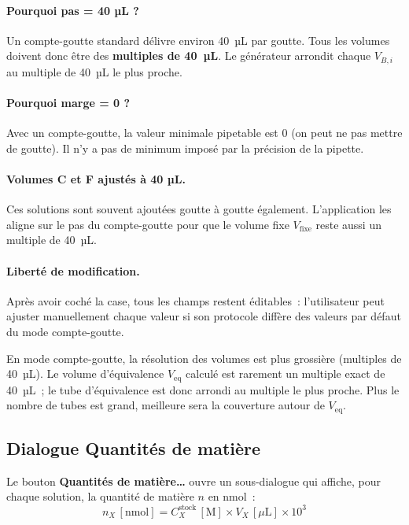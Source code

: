 \documentclass[12pt, a4paper]{article}
\begin{document}
\paragraph{Pourquoi pas = 40 µL ?}
Un compte-goutte standard délivre environ 40~µL par goutte. Tous les volumes
doivent donc être des \textbf{multiples de 40~µL}. Le générateur arrondit
chaque $V_{B,i}$ au multiple de 40~µL le plus proche.

\paragraph{Pourquoi marge = 0 ?}
Avec un compte-goutte, la valeur minimale pipetable est 0 (on peut ne pas
mettre de goutte). Il n'y a pas de minimum imposé par la précision de la
pipette.

\paragraph{Volumes C et F ajustés à 40 µL.}
Ces solutions sont souvent ajoutées goutte à goutte également. L'application
les aligne sur le pas du compte-goutte pour que le volume fixe
$V_\text{fixe}$ reste aussi un multiple de 40~µL.

\paragraph{Liberté de modification.}
Après avoir coché la case, tous les champs restent éditables~: l'utilisateur
peut ajuster manuellement chaque valeur si son protocole diffère des valeurs
par défaut du mode compte-goutte.

\begin{remarque}
En mode compte-goutte, la résolution des volumes est plus grossière
(multiples de 40~µL). Le volume d'équivalence $V_\text{eq}$ calculé est
rarement un multiple exact de 40~µL~; le tube \og d'équivalence\fg{}
est donc arrondi au multiple le plus proche. Plus le nombre de tubes est
grand, meilleure sera la couverture autour de $V_\text{eq}$.
\end{remarque}

\subsection{Dialogue \og Quantités de matière\fg{}}

Le bouton \textbf{Quantités de matière\ldots} ouvre un sous-dialogue qui
affiche, pour chaque solution, la quantité de matière $n$ en nmol~:
\[
n_X\,[\text{nmol}] = C_X^\text{stock}\,[\text{M}] \times V_X\,[\mu\text{L}]
                   \times 10^3
\]
\end{document}
